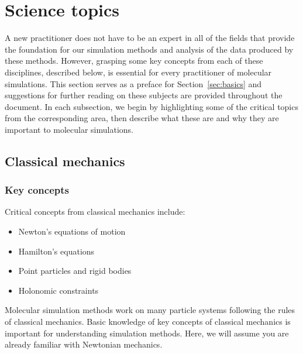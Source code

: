\documentclass[9pt,bestpractices]{livecoms}
\begin{document}
\section{Science topics}
\label{sec:science}
A new practitioner does not have to be an expert in all of the fields that provide the foundation for our simulation methods and analysis of the data produced by these methods. 
However, grasping some key concepts from each of these disciplines, described below, is essential for every practitioner of molecular simulations. This section serves as a preface for Section~\ref{sec:basics} and suggestions for further reading on these subjects are provided throughout the document.
In each subsection, we begin by highlighting some of the critical topics from the corresponding area, then describe what these are and why they are important to molecular simulations.

\subsection{Classical mechanics}
\label{sec:classical_mechanics}
\subsubsection{Key concepts}

Critical concepts from classical mechanics include:
\begin{itemize}
\item Newton's equations of motion 
\item Hamilton's equations
\item Point particles and rigid bodies
\item Holonomic constraints
\end{itemize}

Molecular simulation methods work on many particle systems following the rules of classical mechanics. 
Basic knowledge of key concepts of classical mechanics is important for understanding simulation methods.
Here, we will assume you are already familiar with Newtonian mechanics.
\end{document}
